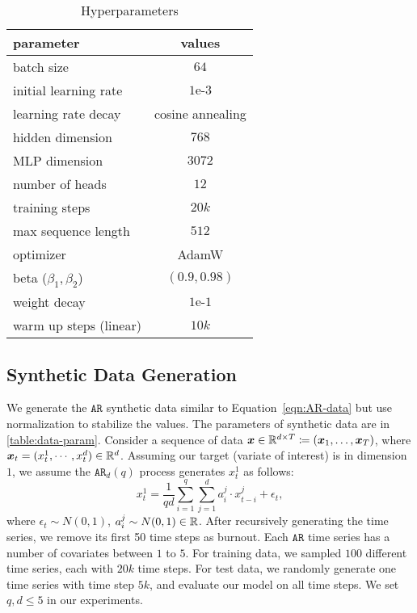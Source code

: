 \begin{table}[h]
        \centering
        \caption{Hyperparameters
        }
        \begin{tabular}{l*{1}{c}}
        \toprule
            \bf{parameter} & \multicolumn{1}{c}{\bf{values}}  \\ 
            \midrule
            batch size & $64$ \\ 
            initial learning rate
            & $1\text{e-}3$ \\
            learning rate decay
            & cosine annealing \\
            hidden dimension
            & $768$ \\
            MLP dimension
            & $3072$ \\
            number of heads
            & $12$\\
            training steps
            & $20k$ \\
            max sequence length & $512$ \\
            \midrule
            optimizer
            & AdamW \\
            beta ($\beta_1, \beta_2$)
            & $(0.9, 0.98)$ \\
            weight decay & $1\text{e-}1$ \\
            warm up steps (linear) & $10k$ \\
            \bottomrule
        \end{tabular}
    \label{table:hyperparameters}
\end{table} 




\subsection{Synthetic Data Generation}
We generate the $\mathtt{AR}$ synthetic data similar to Equation~\eqref{eqn:AR-data} but use normalization to stabilize the values.
The parameters of synthetic data are in \cref{table:data-param}.
Consider a sequence of data 
$\bm{x} \in \mathbb{R}^{d \times T} \coloneqq (\bm{x}_1, \dots, \bm{x}_T)$, where $\bm{x}_t = (x_t^1, \cdots, x_t^d) \in \mathbb{R}^d$.
Assuming our target (variate of interest) is in dimension $1$, we assume the $\mathtt{AR}_d(q)$ process generates $x_t^1$ as follows:
\begin{equation}
    x_{t}^1
    =
    \frac{1}{qd}
    \sum_{i=1}^q
    \sum_{j=1}^d
    a_i^j \cdot x_{t-i}^j
    + \epsilon_t
    ,
\end{equation}
where $\epsilon_t \sim N(0, 1)$, $a_i^j \sim N(0, 1) \in \mathbb{R}$.
After recursively generating the time series, we remove its first 50 time steps as burnout.
Each $\mathtt{AR}$ time series has a number of covariates between $1$ to $5$.
For training data, we sampled $100$ different time series, each with $20k$ time steps.
For test data, we randomly generate one time series with time step $5k$, and evaluate our model on all time steps.
We set $q, d \leq 5$ in our experiments.

